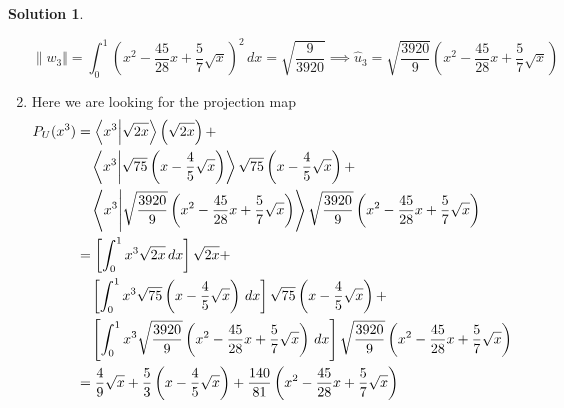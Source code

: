 \documentclass[10pt]{article}
\theoremstyle{definition}
\newtheorem{soln}{Solution}
\newcommand{\vlen}[1]{\| {#1}\Vert }
\begin{document}
\begin{soln}
\begin{enumerate}[label=(\alph*)]
          $$\vlen{w_3}=\int_{0}^{1}\left(x^2-\frac{45}{28}x+\frac{5}{7}\sqrt{x}\right)^2\,dx=\sqrt{\frac{9}{3920}}
            \implies\hat{u}_3=\sqrt{\frac{3920}{9}}\left(x^2-\frac{45}{28}x+\frac{5}{7}\sqrt{x}\right)$$
    \item Here we are looking for the projection map
          \begin{align*}
            P_U(x^3) & =\braket{x^3}{\sqrt{2x}}\left(\sqrt{2x}\right)+                                                                                                                                       \\
                     & \quad\braket{x^3}{\sqrt{75}\left(x-\frac{4}{5}\sqrt{x}\right)}\sqrt{75}\left(x-\frac{4}{5}\sqrt{x}\right)+                                                                            \\
                     & \quad\braket{x^3}{\sqrt{\frac{3920}{9}}\left(x^2-\frac{45}{28}x+\frac{5}{7}\sqrt{x}\right)}\sqrt{\frac{3920}{9}}\left(x^2-\frac{45}{28}x+\frac{5}{7}\sqrt{x}\right)                   \\
                     & = \left[\int_{0}^{1}x^3\sqrt{2x}\,dx\right]\sqrt{2x} +                                                                                                                                \\
                     & \quad\left[\int_{0}^{1}x^3\sqrt{75}\left(x-\frac{4}{5}\sqrt{x}\right)\,dx\right]\sqrt{75}\left(x-\frac{4}{5}\sqrt{x}\right)+                                                          \\
                     & \quad\left[\int_{0}^{1}x^3\sqrt{\frac{3920}{9}}\left(x^2-\frac{45}{28}x+\frac{5}{7}\sqrt{x}\right)\,dx\right]\sqrt{\frac{3920}{9}}\left(x^2-\frac{45}{28}x+\frac{5}{7}\sqrt{x}\right) \\
                     & =\frac{4}{9}\sqrt{x}+\frac{5}{3}\left(x-\frac{4}{5}\sqrt{x}\right)+\frac{140}{81}\left(x^2-\frac{45}{28}x+\frac{5}{7}\sqrt{x}\right)
          \end{align*}
  \end{enumerate}
\end{soln}
\end{document}
